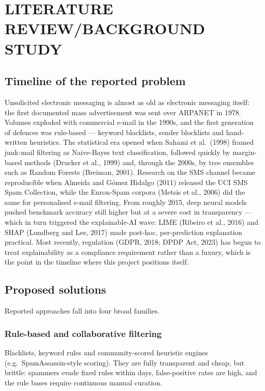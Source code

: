 \documentclass[12pt,a4paper]{report}
\begin{document}
\chapter{LITERATURE REVIEW/BACKGROUND STUDY}

\section{Timeline of the reported problem}

Unsolicited electronic messaging is almost as old as electronic messaging
itself: the first documented mass advertisement was sent over ARPANET in
1978. Volumes exploded with commercial e-mail in the 1990s, and the first
generation of defences was rule-based --- keyword blacklists, sender
blocklists and hand-written heuristics. The statistical era opened when
Sahami et al.\ (1998) framed junk-mail filtering as Naive-Bayes text
classification, followed quickly by margin-based methods (Drucker et al.,
1999) and, through the 2000s, by tree ensembles such as Random Forests
(Breiman, 2001). Research on the SMS channel became reproducible when
Almeida and G\'{o}mez Hidalgo (2011) released the UCI SMS Spam Collection,
while the Enron-Spam corpora (Metsis et al., 2006) did the same for
personalised e-mail filtering. From roughly 2015, deep neural models pushed
benchmark accuracy still higher but at a severe cost in transparency ---
which in turn triggered the explainable-AI wave: LIME (Ribeiro et al., 2016)
and SHAP (Lundberg and Lee, 2017) made post-hoc, per-prediction explanation
practical. Most recently, regulation (GDPR, 2018; DPDP Act, 2023) has begun
to treat explainability as a compliance requirement rather than a luxury,
which is the point in the timeline where this project positions itself.

\section{Proposed solutions}

Reported approaches fall into four broad families.

\subsection{Rule-based and collaborative filtering}

Blacklists, keyword rules and community-scored heuristic engines (e.g.\
SpamAssassin-style scoring). They are fully transparent and cheap, but
brittle: spammers evade fixed rules within days, false-positive rates are
high, and the rule bases require continuous manual curation.
\end{document}
